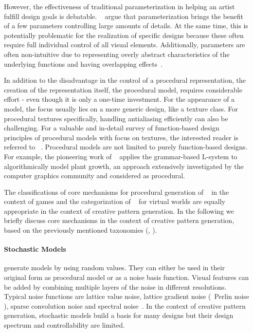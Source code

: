 However, the effectiveness of traditional parameterization in helping an artist fulfill design goals is debatable. \citeauthor*{ebert_2003_tmp}~\cite{ebert_2003_tmp} argue that parameterization brings the benefit of a few parameters controlling large amounts of details. At the same time, this is potentially problematic for the realization of specific designs because these often require full individual control of all visual elements. Additionally, parameters are often non-intuitive due to representing overly abstract characteristics of the underlying functions and having overlapping effects~\cite{bourque_2004_ptm,lagae_2010_pis,gilet_2010_ias,benes_2011_gpm,lasram_2012_ssf,lasram_2012_ptp}.

In addition to the disadvantage in the control of a procedural representation, the creation of the representation itself, the procedural model, requires considerable effort - even though it is only a one-time investment. For the appearance of a model, the focus usually lies on a more generic design, like a texture class. For procedural textures specifically, handling antialiasing efficiently can also be challenging. For a valuable and in-detail survey of function-based design principles of procedural models with focus on textures, the interested reader is referred to \citeauthor*{ebert_2003_tmp}~\cite{ebert_2003_tmp}. Procedural models are not limited to purely function-based designs. For example, the pioneering work of \citeauthor*{Prusinkiewicz_2012_TAB}~\cite{Prusinkiewicz_2012_TAB} applies the grammar-based L-system to algorithmically model plant growth, an approach extensively investigated by the computer graphics community and considered as procedural.

The classifications of core mechanisms for procedural generation of \citeauthor*{hendrikx_2013_pcg}~\cite{hendrikx_2013_pcg} in the context of games and the categorization of \citeauthor*{smelik_2014_aso}~\cite{smelik_2014_aso} for virtual worlds are equally appropriate in the context of creative pattern generation. In the following we briefly discuss core mechanisms in the context of creative pattern generation, based on the previously mentioned taxonomies (\cite{hendrikx_2013_pcg}, \cite{smelik_2014_aso}).

\paragraph*{Stochastic Models} generate models by using random values. They can either be used in their original form as procedural model or as a noise basis function. Visual features can be added by combining multiple layers of the noise in different resolutions. Typical noise functions are lattice value noise, lattice gradient noise (\eg~Perlin noise \cite{perlin_1985_ais}), sparse convolution noise and spectral noise~\cite{ebert_2003_tmp,lagae_2010_sap}. 
In the context of creative pattern generation, stochastic models build a basis for many designs but their design spectrum and controllability are limited.

